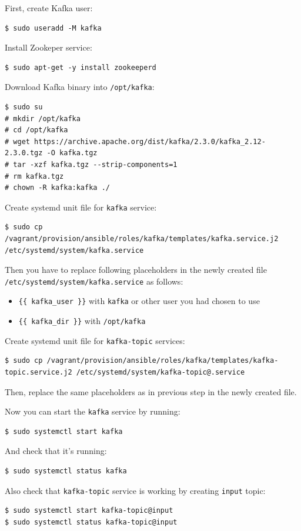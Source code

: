 \documentclass[a4paper]{article} %
\begin{document}
First, create Kafka user:
\begin{lstlisting}
$ sudo useradd -M kafka
\end{lstlisting}

Install Zookeper service:
\begin{lstlisting}
$ sudo apt-get -y install zookeeperd
\end{lstlisting}

Download Kafka binary into \texttt{/opt/kafka}:
\begin{lstlisting}
$ sudo su
# mkdir /opt/kafka
# cd /opt/kafka
# wget https://archive.apache.org/dist/kafka/2.3.0/kafka_2.12-2.3.0.tgz -O kafka.tgz
# tar -xzf kafka.tgz --strip-components=1
# rm kafka.tgz
# chown -R kafka:kafka ./
\end{lstlisting}

Create systemd unit file for \texttt{kafka} service:
\begin{lstlisting}
$ sudo cp /vagrant/provision/ansible/roles/kafka/templates/kafka.service.j2 /etc/systemd/system/kafka.service
\end{lstlisting}

Then you have to replace following placeholders in the newly created file \texttt{/etc/systemd/system/kafka.service} as follows:
\begin{itemize}[noitemsep,nolistsep]
\item \texttt{\{\{ kafka\_user \}\}} with \texttt{kafka} or other user you had chosen to use
\item \texttt{\{\{ kafka\_dir \}\}} with \texttt{/opt/kafka}
\end{itemize}

Create systemd unit file for \texttt{kafka-topic} services:
\begin{lstlisting}
$ sudo cp /vagrant/provision/ansible/roles/kafka/templates/kafka-topic.service.j2 /etc/systemd/system/kafka-topic@.service
\end{lstlisting}
Then, replace the same placeholders as in previous step in the newly created file.

Now you can start the \texttt{kafka} service by running:
\begin{lstlisting}
$ sudo systemctl start kafka
\end{lstlisting}

And check that it's running:
\begin{lstlisting}
$ sudo systemctl status kafka
\end{lstlisting}

Also check that \texttt{kafka-topic} service is working by creating \texttt{input} topic:
\begin{lstlisting}
$ sudo systemctl start kafka-topic@input
$ sudo systemctl status kafka-topic@input
\end{lstlisting}
\end{document}
